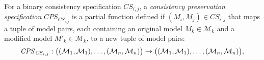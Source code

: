 \begin{definition}
\label{def:consistency_preservation_specification}
For a binary consistency specification $\mathit{CS}_{i, j}$, a \emph{consistency preservation specification} $\mathit{CPS}_{\mathit{CS}_{i,j}}$ is a partial function defined if $(M_i, M_j) \in \mathit{CS}_{i,j}$
that maps a tuple of model pairs, each containing an original model $M_k \in \mathcal{M}_k$ and a modified model $M'_k \in \mathcal{M}_k$, to a new tuple of model pairs:
\begin{align*}
    \mathit{CPS}_{\mathit{CS}_{i,j}}: \hspace{0.3em} & \big( (\mathcal{M}_1, \mathcal{M}_1), \ldots, (\mathcal{M}_n, \mathcal{M}_n) \big) \rightarrow \big( (\mathcal{M}_1, \mathcal{M}_1), \ldots, (\mathcal{M}_n, \mathcal{M}_n) \big), \\[0.5em]

\end{align*}
\end{definition}
